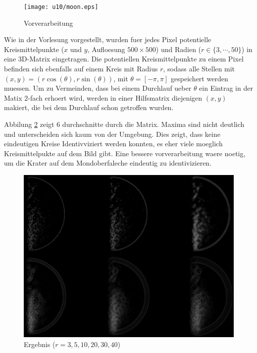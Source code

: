 \begin{figure}[H]
\begin{center}
\texttt{[image: u10/moon.eps]}
\end{center}
\label{moon}
\caption{Vorverarbeitung}
\end{figure}

Wie in der Vorlesung vorgestellt, wurden fuer jedes Pixel potentielle
Kreismittelpunkte ($x$ und $y$, Aufloesung $500\times 500$) und Radien ($r \in \{3,\cdots,50\}$) in eine
3D-Matrix eingetragen. Die potentiellen Kreismittelpunkte zu einem Pixel
befinden sich ebenfalls auf einem Kreis mit Radius $r$, sodass alle Stellen mit 
$(x,y) = (r \cos(\theta), r \sin(\theta))$, mit $\theta = [-\pi, \pi]$ gespeichert werden muessen.
Um zu Vermeinden, dass bei einem Durchlauf ueber $\theta$ ein Eintrag in der Matix 2-fach erhoert wird,
werden in einer Hilfsmatrix diejenigen $(x,y)$ makiert, die bei dem Durchlauf schon getroffen wurden.

Abbilung \ref{moons} zeigt 6 durchschnitte durch die Matrix. Maxima sind nicht deutlich und unterscheiden sich kaum von der Umgebung.
Dies zeigt, dass keine eindeutigen Kreise Identivviziert werden konnten, es eher viele moeglich Kreismittelpukte auf dem Bild gibt.
Eine bessere vorverarbeitung waere noetig, um die Krater auf dem Mondoberfaleche eindeutig zu identivizieren.
\begin{figure}[H]
\begin{center}
\includegraphics[width=180mm]{u10/moons.eps}
\end{center}
\label{moons}
\caption{Ergebnis ($r=3,5,10,20,30,40$)}
\end{figure}



